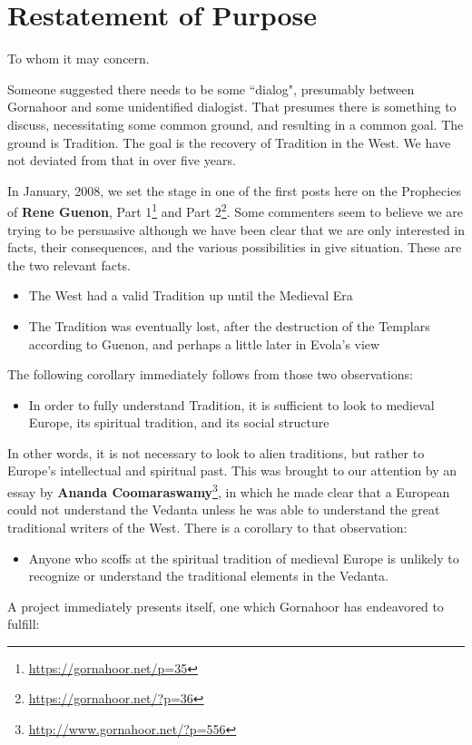 \section{Restatement of Purpose}

To whom it may concern.

Someone suggested there needs to be some ``dialog", presumably between Gornahoor and some unidentified dialogist. That
presumes there is something to discuss, necessitating some common ground, and resulting in a common goal. The ground is
Tradition. The goal is the recovery of Tradition in the West. We have not deviated from that in over five years.

In January, 2008, we set the stage in one of the first posts here on the Prophecies of \textbf{Rene Guenon}, Part 1\footnote{\url{https://gornahoor.net/p=35}} and
Part 2\footnote{\url{https://gornahoor.net/?p=36}}. Some commenters seem to believe we are trying to be persuasive although we have been clear that we are only
interested in facts, their consequences, and the various possibilities in give situation. These are the two relevant
facts.

\begin{itemize}
\item The West had a valid Tradition up until the Medieval Era 
\item The Tradition was eventually lost, after the destruction of the Templars according to Guenon, and perhaps a little
later in Evola's view 
\end{itemize}
The following corollary immediately follows from those two observations:

\begin{itemize}
\item In order to fully understand Tradition, it is sufficient to look to medieval Europe, its spiritual tradition, and
its social structure 
\end{itemize}
In other words, it is not necessary to look to alien traditions, but rather to Europe's
intellectual and spiritual past. This was brought to our attention by an essay by \textbf{Ananda Coomaraswamy}\footnote{\url{http://www.gornahoor.net/?p=556}}, in
which he made clear that a European could not understand the Vedanta unless he was able to understand the great
traditional writers of the West. There is a corollary to that observation:

\begin{itemize}
\item Anyone who scoffs at the spiritual tradition of medieval Europe is unlikely to recognize or understand the
traditional elements in the Vedanta. 
\end{itemize}
A project immediately presents itself, one which Gornahoor has endeavored to fulfill:

